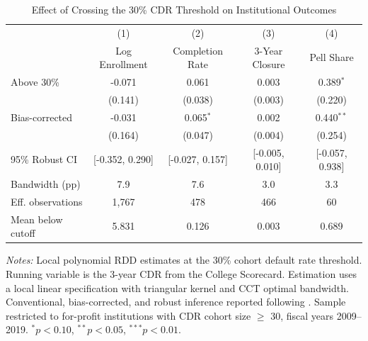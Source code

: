 \begin{table}[t]
\centering
\caption{Effect of Crossing the 30\% CDR Threshold on Institutional Outcomes}
\label{tab:main_rdd}
\begin{tabular}{lcccc}
\toprule
 & (1) & (2) & (3) & (4) \\
 & Log Enrollment & Completion Rate & 3-Year Closure & Pell Share \\
\midrule
Above 30\% & -0.071 & 0.061 & 0.003 & 0.389$^{*}$ \\
 & (0.141) & (0.038) & (0.003) & (0.220) \\
[0.5em]
Bias-corrected & -0.031 & 0.065$^{*}$ & 0.002 & 0.440$^{**}$ \\
 & (0.164) & (0.047) & (0.004) & (0.254) \\
95\% Robust CI & [-0.352, 0.290] & [-0.027, 0.157] & [-0.005, 0.010] & [-0.057, 0.938] \\
\midrule
Bandwidth (pp) & 7.9 & 7.6 & 3.0 & 3.3 \\
Eff. observations & 1,767 & 478 & 466 & 60 \\
Mean below cutoff & 5.831 & 0.126 & 0.003 & 0.689 \\
\bottomrule
\end{tabular}
\begin{minipage}{0.95\textwidth}
\vspace{0.5em}\footnotesize
\textit{Notes:} Local polynomial RDD estimates at the 30\% cohort default rate threshold. Running variable is the 3-year CDR from the College Scorecard. Estimation uses a local linear specification with triangular kernel and CCT optimal bandwidth. Conventional, bias-corrected, and robust inference reported following \citet{cattaneo2020}. Sample restricted to for-profit institutions with CDR cohort size $\geq$ 30, fiscal years 2009--2019. $^{*}p<0.10$, $^{**}p<0.05$, $^{***}p<0.01$.
\end{minipage}
\end{table}
